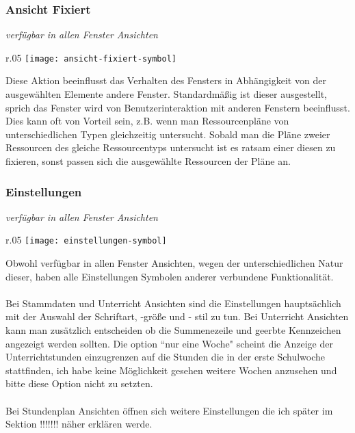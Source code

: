 \subsubsection{Ansicht Fixiert}
{\small\textit{verfügbar in allen Fenster Ansichten\\}\par}

\begin{wrapfigure}{r}{.05\textwidth}
	\vspace{-50pt}
	\texttt{[image: ansicht-fixiert-symbol]}
	\vspace{-35pt}
\end{wrapfigure}

\noindent
Diese Aktion beeinflusst das Verhalten des Fensters in Abhängigkeit von der ausgewählten Elemente andere Fenster. Standardmäßig ist dieser ausgestellt, sprich das Fenster wird von Benutzerinteraktion mit anderen Fenstern beeinflusst. Dies kann oft von Vorteil sein, z.B. wenn man Ressourcenpläne von unterschiedlichen Typen gleichzeitig untersucht. Sobald man die Pläne zweier Ressourcen des gleiche Ressourcentyps untersucht ist es ratsam einer diesen zu fixieren, sonst passen sich die ausgewählte Ressourcen der Pläne an.\\

\subsubsection{Einstellungen}
{\small\textit{verfügbar in allen Fenster Ansichten\\}\par}

\begin{wrapfigure}{r}{.05\textwidth}
	\vspace{-50pt}
	\texttt{[image: einstellungen-symbol]}
	\vspace{-35pt}
\end{wrapfigure}

\noindent
Obwohl verfügbar in allen Fenster Ansichten, wegen der unterschiedlichen Natur dieser, haben alle Einstellungen Symbolen anderer verbundene Funktionalität.\\
\\
Bei Stammdaten und Unterricht Ansichten sind die Einstellungen hauptsächlich mit der Auswahl der Schriftart, -größe und - stil zu tun. Bei Unterricht Ansichten kann man zusätzlich entscheiden ob die Summenezeile und geerbte Kennzeichen angezeigt werden sollten. Die option ``nur eine Woche" scheint die Anzeige der Unterrichtstunden einzugrenzen auf die Stunden die in der erste Schulwoche stattfinden, ich habe keine Möglichkeit gesehen weitere Wochen anzusehen und bitte diese Option nicht zu setzten.\\
\\
Bei Stundenplan Ansichten öffnen sich weitere Einstellungen die ich später im Sektion !!!!!!! näher erklären werde.\\

